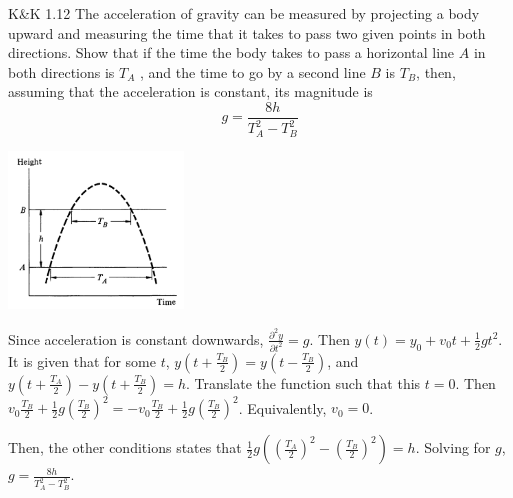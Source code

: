 \documentclass{esg8012pset}
\begin{document}
\begin{question}[Problem 2]
\begin{problem}{K\&K 1.12}
  The acceleration of gravity can be measured by projecting a body upward and measuring the
  time that it takes to pass two given points in both directions. Show that if the time the body takes
  to pass a horizontal line $A$ in both directions is $T_A$ , and the time to go by a second line $B$ is $T_B$,
  then, assuming that the acceleration is constant, its magnitude is
  $$g = \frac{8h}{T_A^2 - T_B^2}$$
  \begin{center}\includegraphics[width=0.35\textwidth]{ps01_1}\end{center}
\end{problem}
\begin{solution}
  Since acceleration is constant downwards, $\frac{\partial^2 y}{\partial t^2} = g$.  Then $y(t) = y_0 + v_0 t + \frac{1}{2} g t^2$.  It is given that for some $t$, $y\left(t + \frac{T_B}{2}\right) = y\left(t - \frac{T_B}{2}\right)$, and $y\left(t + \frac{T_A}{2}\right) - y\left(t + \frac{T_B}{2}\right) = h$.  Translate the function such that this $t = 0$.  Then $v_0 \frac{T_B}{2} + \frac{1}{2} g \left(\frac{T_B}{2}\right)^2 = -v_0 \frac{T_B}{2} + \frac{1}{2} g \left(\frac{T_B}{2}\right)^2$.  Equivalently, $v_0 = 0$.

  Then, the other conditions states that $\frac{1}{2} g\left(\left(\frac{T_A}{2}\right)^2 - \left(\frac{T_B}{2}\right)^2\right) = h$.  Solving for $g$, $g = \frac{8h}{T_A^2 - T_B^2}$.
\end{solution}


\end{question}
\end{document}
